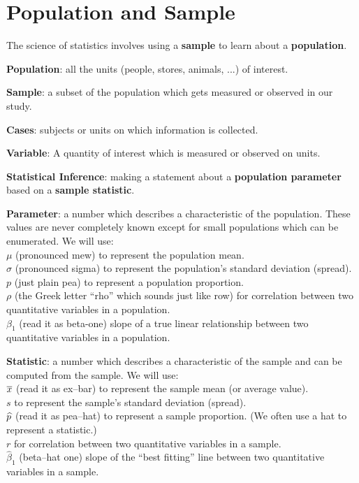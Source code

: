\def\theTopic{Reading 2}


 \section{ Population and Sample}


The science of statistics involves using a {\bf sample} to learn about
a {\bf population}.

{\bf Population}: all the units (people, stores, animals, ...) of
interest.

{\bf Sample}:  a subset of the population which gets measured or
observed in our study.

{\bf Cases}:  subjects or units on which information is collected.  

{\bf Variable}:  A quantity of interest which is measured or observed
on units.

{\bf Statistical  Inference}: making a statement about a
{\bf population parameter} based on a {\bf  sample statistic}.

{\bf Parameter}:  a number which describes a characteristic of the
population. These values are never completely known except for small
populations which can be enumerated. We will use:\\
  $\mu$ (pronounced mew) to represent the population mean.\\
  $\sigma$ (pronounced sigma) to represent the population's standard deviation
  (spread).\\
  $p$ (just plain pea) to represent a population proportion.\\
  $\rho$ (the Greek letter ``rho'' which sounds just like row) for
  correlation between two 
  quantitative variables in a population.\\
  $\beta_1$ (read it as beta-one) slope of a true
  linear relationship between  two 
  quantitative variables in a population.

{\bf Statistic}:  a number which describes a characteristic of the
sample and can be computed from the sample. We will use:\\
  $\overline{x}$ (read it as ex--bar) to represent the sample mean (or average value).\\
  $s$  to represent the sample's standard deviation
  (spread).\\
  $\widehat{p}$ (read it as pea--hat) to represent a sample proportion.  (We
  often use a hat to  represent a statistic.)\\
  $r$  for correlation between two  quantitative variables in a sample.\\
  $\widehat{\beta}_1$ (beta--hat one) slope of the ``best fitting''
  line  between  two  quantitative variables in a sample.

